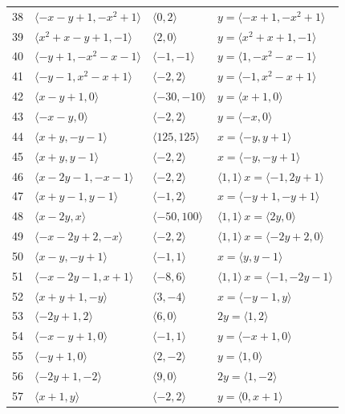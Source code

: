 \documentclass[11pt]{article}
\begin{document}
\begin{longtable}{@{}rlll@{}}
38 & $\langle -x-y+1,-x^{2}+1\rangle$ & $\langle 0,2\rangle$ & $y=\langle -x+1,-x^{2}+1\rangle$\\
39 & $\langle x^{2}+x-y+1,-1\rangle$ & $\langle 2,0\rangle$ & $y=\langle x^{2}+x+1,-1\rangle$\\
40 & $\langle -y+1,-x^{2}-x-1\rangle$ & $\langle -1,-1\rangle$ & $y=\langle 1,-x^{2}-x-1\rangle$\\
41 & $\langle -y-1,x^{2}-x+1\rangle$ & $\langle -2,2\rangle$ & $y=\langle -1,x^{2}-x+1\rangle$\\
42 & $\langle x-y+1,0\rangle$ & $\langle -30,-10\rangle$ & $y=\langle x+1,0\rangle$\\
43 & $\langle -x-y,0\rangle$ & $\langle -2,2\rangle$ & $y=\langle -x,0\rangle$\\
44 & $\langle x+y,-y-1\rangle$ & $\langle 125,125\rangle$ & $x=\langle -y,y+1\rangle$\\
45 & $\langle x+y,y-1\rangle$ & $\langle -2,2\rangle$ & $x=\langle -y,-y+1\rangle$\\
46 & $\langle x-2y-1,-x-1\rangle$ & $\langle -2,2\rangle$ & $\langle 1,1\rangle\,x=\langle -1,2y+1\rangle$\\
47 & $\langle x+y-1,y-1\rangle$ & $\langle -1,2\rangle$ & $x=\langle -y+1,-y+1\rangle$\\
48 & $\langle x-2y,x\rangle$ & $\langle -50,100\rangle$ & $\langle 1,1\rangle\,x=\langle 2y,0\rangle$\\
49 & $\langle -x-2y+2,-x\rangle$ & $\langle -2,2\rangle$ & $\langle 1,1\rangle\,x=\langle -2y+2,0\rangle$\\
50 & $\langle x-y,-y+1\rangle$ & $\langle -1,1\rangle$ & $x=\langle y,y-1\rangle$\\
51 & $\langle -x-2y-1,x+1\rangle$ & $\langle -8,6\rangle$ & $\langle 1,1\rangle\,x=\langle -1,-2y-1\rangle$\\
52 & $\langle x+y+1,-y\rangle$ & $\langle 3,-4\rangle$ & $x=\langle -y-1,y\rangle$\\
53 & $\langle -2y+1,2\rangle$ & $\langle 6,0\rangle$ & $2y=\langle 1,2\rangle$\\
54 & $\langle -x-y+1,0\rangle$ & $\langle -1,1\rangle$ & $y=\langle -x+1,0\rangle$\\
55 & $\langle -y+1,0\rangle$ & $\langle 2,-2\rangle$ & $y=\langle 1,0\rangle$\\
56 & $\langle -2y+1,-2\rangle$ & $\langle 9,0\rangle$ & $2y=\langle 1,-2\rangle$\\
57 & $\langle x+1,y\rangle$ & $\langle -2,2\rangle$ & $y=\langle 0,x+1\rangle$\\
\end{longtable}
\endgroup
\end{document}
